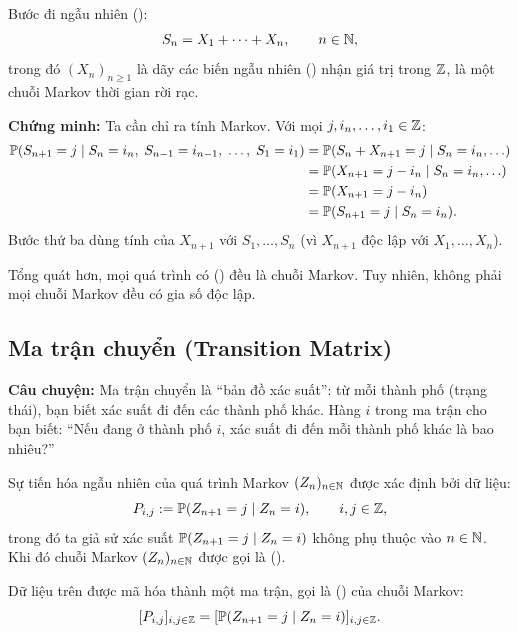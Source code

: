 \begin{example}
Bước đi ngẫu nhiên ():
\begin{equation}\label{eq:random-walk}
  S_n = X_1 + \cdots + X_n, \qquad n \in \mathbb{N},
\end{equation}
trong đó $(X_n)_{n \geq 1}$ là dãy các biến ngẫu nhiên  ()
nhận giá trị trong $\mathbb{Z}$, là một chuỗi Markov thời gian rời rạc.

\textbf{Chứng minh:} Ta cần chỉ ra tính Markov. Với mọi $j, i_n, \ldots, i_1 \in \mathbb{Z}$:
\begin{align*}
  \mathbb{P}(S_{n+1} = j \mid S_n = i_n,\; S_{n-1} = i_{n-1},\; \ldots,\; S_1 = i_1)
  &= \mathbb{P}(S_n + X_{n+1} = j \mid S_n = i_n, \ldots) \\
  &= \mathbb{P}(X_{n+1} = j - i_n \mid S_n = i_n, \ldots) \\
  &= \mathbb{P}(X_{n+1} = j - i_n) \\
  &= \mathbb{P}(S_{n+1} = j \mid S_n = i_n).
\end{align*}
Bước thứ ba dùng tính  của $X_{n+1}$ với $S_1, \ldots, S_n$ (vì $X_{n+1}$ độc lập với $X_1, \ldots, X_n$).
\end{example}

Tổng quát hơn, mọi quá trình có  () đều là chuỗi Markov. Tuy nhiên, không phải mọi chuỗi Markov đều có gia số độc lập.

\subsection{Ma trận chuyển (Transition Matrix)}
\label{subsec:transition-matrix}

\textbf{Câu chuyện:} Ma trận chuyển là ``bản đồ xác suất'': từ mỗi thành phố (trạng thái),
bạn biết xác suất đi đến các thành phố khác. Hàng $i$ trong ma trận cho bạn biết:
``Nếu đang ở thành phố $i$, xác suất đi đến mỗi thành phố khác là bao nhiêu?''

Sự tiến hóa ngẫu nhiên của quá trình Markov $(Z_n)_{n\in\mathbb{N}}$ được xác định bởi dữ liệu:
\[
  P_{i,j} := \mathbb{P}(Z_{n+1} = j \mid Z_n = i), \qquad i, j \in \mathbb{Z},
\]
trong đó ta giả sử xác suất $\mathbb{P}(Z_{n+1} = j \mid Z_n = i)$ không phụ thuộc vào $n \in \mathbb{N}$.
Khi đó chuỗi Markov $(Z_n)_{n\in\mathbb{N}}$ được gọi là  ().

\begin{dinhnghia}
Dữ liệu trên được mã hóa thành một ma trận, gọi là  () của chuỗi Markov:
\[
  [P_{i,j}]_{i,j\in\mathbb{Z}} = [\mathbb{P}(Z_{n+1} = j \mid Z_n = i)]_{i,j\in\mathbb{Z}}.
\]
\end{dinhnghia}


